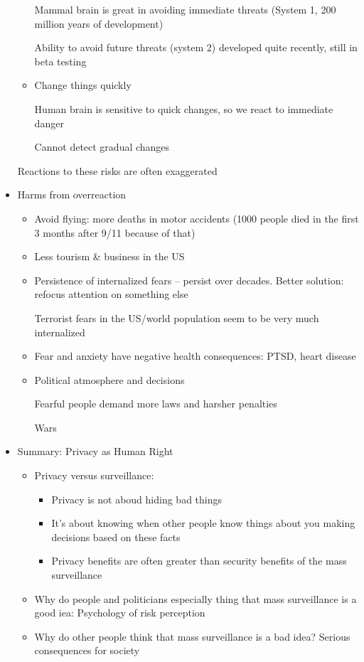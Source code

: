 \documentclass[a4paper,12pt]{scrartcl}
\begin{document}
\begin{itemize}
\begin{itemize}
				Mammal brain is great in avoiding immediate threats (System 1, 200 million years of development)

				Ability to avoid future threats (system 2) developed quite recently, still in beta testing
			\item
				Change things quickly

				Human brain is sensitive to quick changes, so we react to immediate danger

				Cannot detect gradual changes
		\end{itemize}
		Reactions to these risks are often exaggerated
	\item
		Harms from overreaction
		\begin{itemize}
			\item
				Avoid flying: more deaths in motor accidents (1000 people died in the first 3 months after 9/11 because of that)
			\item
				Less tourism \& business in the US
			\item
				Persistence of internalized fears -- persist over decades. Better solution: refocus attention on something else

				Terrorist fears in the US/world population seem to be very much internalized
			\item
				Fear and anxiety have negative health consequences: PTSD, heart disease
			\item
				Political atmosphere and decisions

				Fearful people demand more laws and harsher penalties

				Wars
		\end{itemize}
	\item
		Summary: Privacy as Human Right
		\begin{itemize}
			\item
				Privacy versus surveillance:
				\begin{itemize}
					\item
						Privacy is not aboud hiding bad things
					\item
						It's about knowing when other people know things about you making decisions based on these facts
					\item
						Privacy benefits are often greater than security benefits of the mass surveillance

				\end{itemize}
			\item
				Why do people and politicians especially thing that mass surveillance is a good iea: Psychology of risk perception
			\item
				Why do other people think that mass surveillance is a bad idea? Serious consequences for society
		\end{itemize}
\end{itemize}



\end{document}

